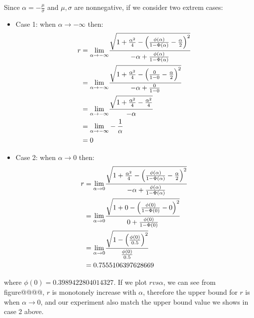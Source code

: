 Since $\alpha = -\frac{\mu}{\sigma}$ and $\mu, \sigma$ are nonnegative, if we consider two extrem cases:

\begin{itemize}
	\item Case 1: when $\alpha \to -\infty$ then: \\ 
	\begin{equation}\notag
		\begin{split}
			r &=  \displaystyle{\lim_{\alpha \to -\infty}}\frac{ \sqrt{1+\frac{\alpha^2}{4}-\left(\frac{ \phi(\alpha)}{1 - \Phi(\alpha)}- \frac{\alpha}{2}\right)^2  }}{ -\alpha + \frac{ \phi(\alpha)}{1 - \Phi(\alpha)}}  \\&= 
			\displaystyle{\lim_{\alpha \to -\infty}}\frac{ \sqrt{1+\frac{\alpha^2}{4}-\left(\frac{0}{1 - 0}- \frac{\alpha}{2}\right)^2  }}{ -\alpha + \frac{ 0}{1 - 0}}  \\&= 
			\displaystyle{\lim_{\alpha \to -\infty}}\frac{ \sqrt{1+\frac{\alpha^2}{4}-\frac{\alpha^2}{4}}}{ -\alpha } \\&= 
			\displaystyle{\lim_{\alpha \to -\infty}}-\frac{1}{\alpha}\\&= 0
		\end{split}
	\end{equation} 
	\item Case 2:  when $\alpha \to 0$ then: \\ 
	\begin{equation}\notag
	\begin{split}
		r &=  \displaystyle{\lim_{\alpha \to 0}}\frac{ \sqrt{1+\frac{\alpha^2}{4}-\left(\frac{ \phi(\alpha)}{1 - \Phi(\alpha)}- \frac{\alpha}{2}\right)^2  }}{ -\alpha + \frac{ \phi(\alpha)}{1 - \Phi(\alpha)}}  \\&= 
		\displaystyle{\lim_{\alpha \to 0}}\frac{ \sqrt{1+0-\left(\frac{ \phi(0)}{1 - \Phi(0)}- 0\right)^2  }}{ 0 + \frac{ \phi(0)}{1 - \Phi(0)}} \\&= 
		\displaystyle{\lim_{\alpha \to 0}}\frac{ \sqrt{1-\left(\frac{ \phi(0)}{0.5}\right)^2  }}{\frac{ \phi(0)}{0.5}} \\&= 0.7555106397628669
	\end{split}
	\end{equation} 
\end{itemize}
where $\phi(0) = 0.3989422804014327$. If we plot $r vs \alpha$, we can see from figure@@@@, $r$ is monotonely increase with $\alpha$, therefore the upper bound for $r$ is when $\alpha \to 0$, and our experiment also match the upper bound value we shows in case 2 above. 


